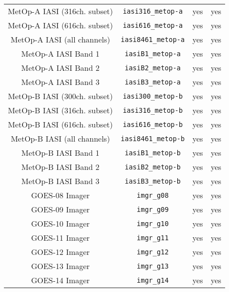 \begin{center}
\begin{longtable}{c c c c}
  MetOp-A IASI (316ch. subset)       & \texttt{iasi316\_metop-a}    &  yes     &  yes       \\
  MetOp-A IASI (616ch. subset)       & \texttt{iasi616\_metop-a}    &  yes     &  yes       \\
  MetOp-A IASI (all channels)        & \texttt{iasi8461\_metop-a}   &  yes     &  yes       \\
  MetOp-A IASI Band 1                & \texttt{iasiB1\_metop-a}     &  yes     &  yes       \\
  MetOp-A IASI Band 2                & \texttt{iasiB2\_metop-a}     &  yes     &  yes       \\
  MetOp-A IASI Band 3                & \texttt{iasiB3\_metop-a}     &  yes     &  yes       \\
  MetOp-B IASI (300ch. subset)       & \texttt{iasi300\_metop-b}    &  yes     &  yes       \\
  MetOp-B IASI (316ch. subset)       & \texttt{iasi316\_metop-b}    &  yes     &  yes       \\
  MetOp-B IASI (616ch. subset)       & \texttt{iasi616\_metop-b}    &  yes     &  yes       \\
  MetOp-B IASI (all channels)        & \texttt{iasi8461\_metop-b}   &  yes     &  yes       \\
  MetOp-B IASI Band 1                & \texttt{iasiB1\_metop-b}     &  yes     &  yes       \\
  MetOp-B IASI Band 2                & \texttt{iasiB2\_metop-b}     &  yes     &  yes       \\
  MetOp-B IASI Band 3                & \texttt{iasiB3\_metop-b}     &  yes     &  yes       \\
  GOES-08 Imager                     & \texttt{imgr\_g08}           &  yes     &  yes       \\
  GOES-09 Imager                     & \texttt{imgr\_g09}           &  yes     &  yes       \\
  GOES-10 Imager                     & \texttt{imgr\_g10}           &  yes     &  yes       \\
  GOES-11 Imager                     & \texttt{imgr\_g11}           &  yes     &  yes       \\
  GOES-12 Imager                     & \texttt{imgr\_g12}           &  yes     &  yes       \\
  GOES-13 Imager                     & \texttt{imgr\_g13}           &  yes     &  yes       \\
  GOES-14 Imager                     & \texttt{imgr\_g14}           &  yes     &  yes       \\

\end{longtable}
\end{center}
